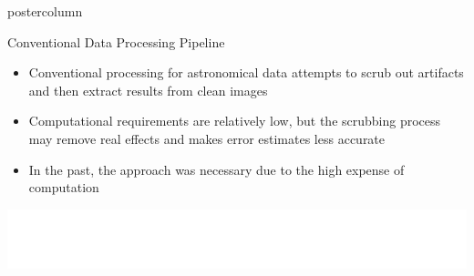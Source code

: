 \documentclass[final,hyperref={pdfpagelabels=false}]{beamer}
\begin{document}
\begin{frame}
\begin{columns}
\begin{column}{.49\textwidth}
\begin{beamercolorbox}[center,wd=\textwidth]{postercolumn}
\begin{minipage}[T]{.95\textwidth}
{            \vspace{2cm}
            \begin{block}{Conventional Data Processing Pipeline}
            \begin{itemize}
              	\item Conventional processing for astronomical data attempts to scrub out artifacts and then extract results from clean images
		\item Computational requirements are relatively low, but the scrubbing process may remove real effects and makes error estimates less accurate
		\item In the past, the approach was necessary due to the high expense of computation
	    \end{itemize}
	      \begin{center}
              \includegraphics[width=0.75\linewidth]{figures/Conventional_Pipeline.pdf}
              \end{center}
            \end{block}

}
\end{minipage}
\end{beamercolorbox}
\end{column}
\end{columns}
\end{frame}
\end{document}

